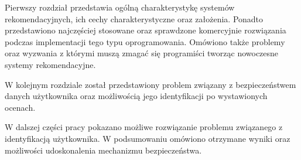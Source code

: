 Pierwszy rozdział przedstawia ogólną charakterystykę systemów rekomendacyjnych, ich cechy charakterystyczne oraz założenia. Ponadto przedstawiono najczęściej stosowane oraz sprawdzone komercyjnie rozwiązania podczas implementacji tego typu oprogramowania. Omówiono także problemy oraz wyzwania z którymi muszą zmagać się programiści tworząc nowoczesne systemy rekomendacyjne.  

W kolejnym rozdziale został przedstawiony problem związany z bezpieczeństwem danych użytkownika oraz możliwością jego identyfikacji po wystawionych ocenach.

W dalszej części pracy pokazano możliwe rozwiązanie problemu związanego z identyfikacją użytkownika.
W podsumowaniu omówiono otrzymane wyniki oraz możliwości udoskonalenia mechanizmu bezpieczeństwa.
